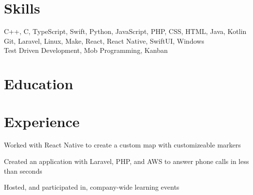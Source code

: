 \documentclass[]{deedy-resume-openfont}
\begin{document}
\hfill
\begin{minipage}[t]{0.95\textwidth}


\section{Skills}
C++, C, TypeScript, Swift, Python, JavaScript, PHP, CSS, HTML, Java, Kotlin\\
Git, Laravel, Linux, Make, React, React Native, SwiftUI, Windows\\
Test Driven Development, Mob Programming, Kanban


\section{Education} 






\section{Experience}



\vspace{\topsep} %
\begin{tightemize}
\item Worked with React Native to create a custom map with customizeable markers
\item Created an application with Laravel, PHP, and AWS to answer phone calls in less than seconds
\item Hosted, and participated in, company-wide learning events
\end{tightemize}


\end{minipage}
\end{document}
